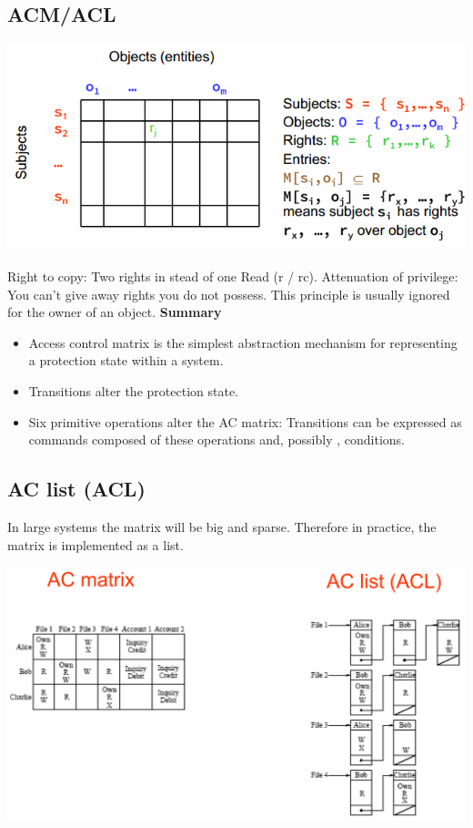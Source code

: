 \documentclass[10pt]{article}
\begin{document}
\subsection{ACM/ACL}
\begin{center}
	\includegraphics[scale=0.4]{acm.png}
\end{center}
Right to copy: Two rights in stead of one Read (r / rc).
Attenuation of privilege: You can't give away rights you do not possess. This principle is usually ignored for the owner of an object.
\textbf{Summary}
\begin{itemize}
	\item Access control matrix is the simplest abstraction  mechanism for representing a   protection state within a system.
	\item Transitions alter the protection state.
	\item Six primitive operations alter the AC matrix: Transitions can be expressed as commands composed of these operations and, possibly , conditions. 
\end{itemize}
\subsection{AC list (ACL)}
In large systems the matrix will be big and sparse.  Therefore in practice, the matrix is implemented as a list.
\begin{center}
	\includegraphics[scale=0.4]{acm_to_acl.png}
\end{center}
\end{document}
